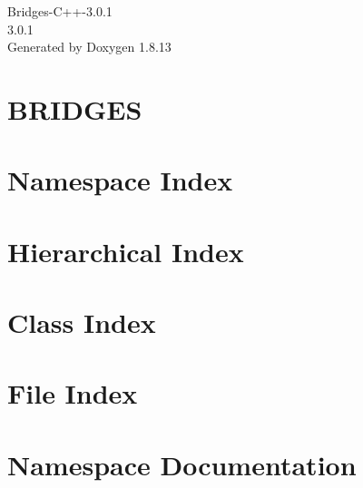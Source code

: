 \documentclass[twoside]{book}
\newcommand{\+}{\discretionary{\mbox{\scriptsize$\hookleftarrow$}}{}{}}
\newcommand{\clearemptydoublepage}{%
  \newpage{\pagestyle{empty}\cleardoublepage}%
}
\begin{document}
\hypersetup{pageanchor=false,
             bookmarksnumbered=true,
             pdfencoding=unicode
            }
\begin{titlepage}
\vspace*{7cm}
\begin{center}%
{\Large Bridges-\/\+C++-\/3.0.1 \\[1ex]\large 3.\+0.\+1 }\\
\vspace*{1cm}
{\large Generated by Doxygen 1.8.13}\\
\end{center}
\end{titlepage}
\clearemptydoublepage
{}
\tableofcontents
\clearemptydoublepage
{}
\hypersetup{pageanchor=true}

\chapter{B\+R\+I\+D\+G\+ES}
\label{index}\hypertarget{index}{}
\chapter{Namespace Index}

\chapter{Hierarchical Index}

\chapter{Class Index}

\chapter{File Index}

\chapter{Namespace Documentation}







\end{document}
